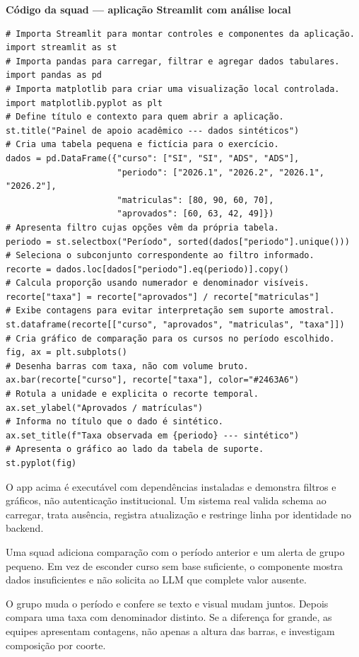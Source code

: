 \textbf{Código da squad --- aplicação Streamlit com análise local}
\begin{verbatim}
# Importa Streamlit para montar controles e componentes da aplicação.
import streamlit as st
# Importa pandas para carregar, filtrar e agregar dados tabulares.
import pandas as pd
# Importa matplotlib para criar uma visualização local controlada.
import matplotlib.pyplot as plt
# Define título e contexto para quem abrir a aplicação.
st.title("Painel de apoio acadêmico --- dados sintéticos")
# Cria uma tabela pequena e fictícia para o exercício.
dados = pd.DataFrame({"curso": ["SI", "SI", "ADS", "ADS"],
                      "periodo": ["2026.1", "2026.2", "2026.1", "2026.2"],
                      "matriculas": [80, 90, 60, 70],
                      "aprovados": [60, 63, 42, 49]})
# Apresenta filtro cujas opções vêm da própria tabela.
periodo = st.selectbox("Período", sorted(dados["periodo"].unique()))
# Seleciona o subconjunto correspondente ao filtro informado.
recorte = dados.loc[dados["periodo"].eq(periodo)].copy()
# Calcula proporção usando numerador e denominador visíveis.
recorte["taxa"] = recorte["aprovados"] / recorte["matriculas"]
# Exibe contagens para evitar interpretação sem suporte amostral.
st.dataframe(recorte[["curso", "aprovados", "matriculas", "taxa"]])
# Cria gráfico de comparação para os cursos no período escolhido.
fig, ax = plt.subplots()
# Desenha barras com taxa, não com volume bruto.
ax.bar(recorte["curso"], recorte["taxa"], color="#2463A6")
# Rotula a unidade e explicita o recorte temporal.
ax.set_ylabel("Aprovados / matrículas")
# Informa no título que o dado é sintético.
ax.set_title(f"Taxa observada em {periodo} --- sintético")
# Apresenta o gráfico ao lado da tabela de suporte.
st.pyplot(fig)
\end{verbatim}

O app acima é executável com dependências instaladas e demonstra filtros e gráficos, não autenticação institucional. Um sistema real valida schema ao carregar, trata ausência, registra atualização e restringe linha por identidade no backend.

Uma squad adiciona comparação com o período anterior e um alerta de grupo pequeno. Em vez de esconder curso sem base suficiente, o componente mostra dados insuficientes e não solicita ao LLM que complete valor ausente.

O grupo muda o período e confere se texto e visual mudam juntos. Depois compara uma taxa com denominador distinto. Se a diferença for grande, as equipes apresentam contagens, não apenas a altura das barras, e investigam composição por coorte.

